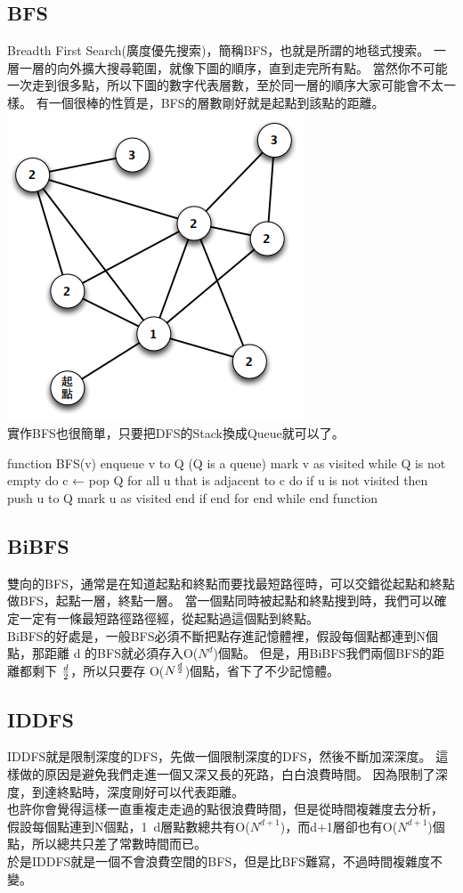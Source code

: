 \documentclass{article}
\begin{document}
\subsection{BFS}
Breadth First Search(廣度優先搜索)，簡稱BFS，也就是所謂的地毯式搜索。
一層一層的向外擴大搜尋範圍，就像下圖的順序，直到走完所有點。
當然你不可能一次走到很多點，所以下圖的數字代表層數，至於同一層的順序大家可能會不太一樣。
有一個很棒的性質是，BFS的層數剛好就是起點到該點的距離。\\
\includegraphics[width=0.5\columnwidth]{BFS.png}\\
實作BFS也很簡單，只要把DFS的Stack換成Queue就可以了。
\begin{algorithm}[caption={BFS}, label={alg1}]
function BFS(v)
    enqueue v to Q (Q is a queue)
    mark v as visited
    while Q is not empty do
        c ← pop Q
        for all u that is adjacent to c do
            if u is not visited then
                push u to Q
                mark u as visited
            end if
        end for
    end while
end function
\end{algorithm}

\subsection{BiBFS}
雙向的BFS，通常是在知道起點和終點而要找最短路徑時，可以交錯從起點和終點做BFS，起點一層，終點一層。
當一個點同時被起點和終點搜到時，我們可以確定一定有一條最短路徑路徑經，從起點過這個點到終點。\\
BiBFS的好處是，一般BFS必須不斷把點存進記憶體裡，假設每個點都連到N個點，那距離 d 的BFS就必須存入O($N^d$)個點。
但是，用BiBFS我們兩個BFS的距離都剩下 $d \over 2$，所以只要存 O($N^{d \over 2}$)個點，省下了不少記憶體。

\subsection{IDDFS}
IDDFS就是限制深度的DFS，先做一個限制深度的DFS，然後不斷加深深度。
這樣做的原因是避免我們走進一個又深又長的死路，白白浪費時間。
因為限制了深度，到達終點時，深度剛好可以代表距離。\\
也許你會覺得這樣一直重複走走過的點很浪費時間，但是從時間複雜度去分析，
假設每個點連到N個點，1~d層點數總共有O($N^{d+1}$)，而d+1層卻也有O($N^{d+1}$)個點，所以總共只差了常數時間而已。\\
於是IDDFS就是一個不會浪費空間的BFS，但是比BFS難寫，不過時間複雜度不變。
\end{document}
